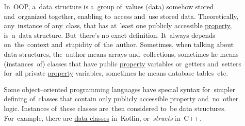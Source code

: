 \label{datastructure}
In~OOP, a~data structure is a~group of~values (data) somehow stored and~organized together, enabling to~access and~use stored data.
Theoretically, any~instance of any~class, that has at~least one publicly accessible \hyperref[variablefieldproperty]{property}, is~a~data structure.
But~there's no exact definition.
It~always depends on~the~context and~stupidity of~the~author.
Sometimes, when talking about data structures, the~author means arrays and~collections, sometimes he means (instances~of) classes that have public \hyperref[variablefieldproperty]{property} variables or~getters and~setters for~all private \hyperref[variablefieldproperty]{property} variables, sometimes he means database tables~etc.

Some object--oriented programming languages have special syntax for~simpler defining of~classes that contain only publicly accessible \hyperref[variablefieldproperty]{property} and~no~other logic.
Instances of~these classes are~then considered to~be data structures.
For~example, there are \hyperref[kotlindataclass]{data classes} in~Kotlin, \mbox{or \textit{structs}} in~C++.

